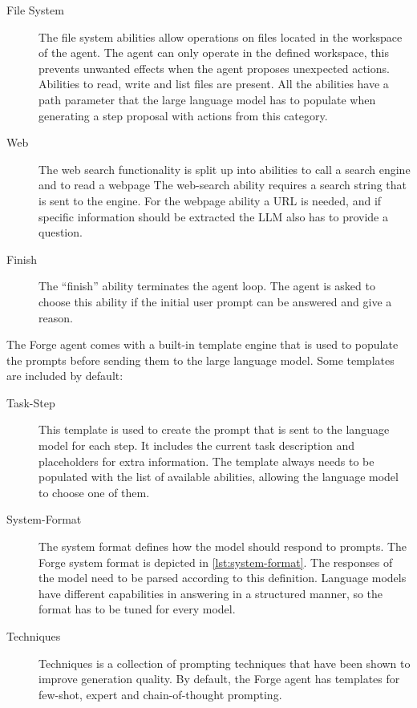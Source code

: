 \documentclass[../main.tex]{subfiles}
\begin{document}
\begin{description}
      \item[File System] The file system abilities allow operations on files located in the workspace of the agent.
            The agent can only operate in the defined workspace, this prevents unwanted effects when the agent proposes unexpected actions.
            Abilities to read, write and list files are present.
            All the abilities have a path parameter that the large language model has to populate when generating a step proposal with actions from this category.
      \item[Web] The web search functionality is split up into abilities to call a search engine and to read a webpage
            The web-search ability requires a search string that is sent to the engine.
            For the webpage ability a URL is needed, and if specific information should be extracted the LLM also has to provide a question.
      \item[Finish] The “finish” ability terminates the agent loop.
            The agent is asked to choose this ability if the initial user prompt can be answered and give a reason.
\end{description}

The Forge agent comes with a built-in template engine that is used
to populate the prompts before sending them to the large language model.
Some templates are included by default:

\begin{description}
      \item[Task-Step] This template is used to create the prompt that is sent to the language model for each step.
            It includes the current task description and placeholders for extra information.
            The template always needs to be populated with the list of available abilities,
            allowing the language model to choose one of them.
      \item[System-Format] The system format defines how the model should respond to prompts.
            The Forge system format is depicted in \autoref{lst:system-format}.
            The responses of the model need to be parsed according to this definition.
            Language models have different capabilities in answering in a structured manner, %
            so the format has to be tuned for every model.
      \item[Techniques] Techniques is a collection of prompting techniques that have been shown to improve generation quality.
            By default, the Forge agent has templates for few-shot, expert and chain-of-thought prompting. %
\end{description}
\end{document}
